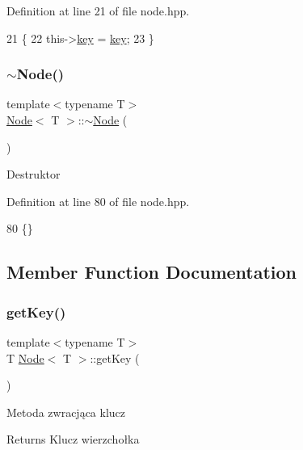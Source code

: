 Definition at line 21 of file node.\+hpp.


\begin{DoxyCode}
21                     \{
22             this->\hyperlink{classNode_a9d5e5c1914f5ed67389740354a607527}{key} = \hyperlink{classNode_a9d5e5c1914f5ed67389740354a607527}{key};
23         \}
\end{DoxyCode}
\mbox{\label{classNode_ae923d0417581dd19784d55b901f0f7f0}} 
\subsubsection{\texorpdfstring{$\sim$\+Node()}{~Node()}}
{\footnotesize\ttfamily template$<$typename T$>$ \\
\hyperlink{classNode}{Node}$<$ T $>$\+::$\sim$\hyperlink{classNode}{Node} (\begin{DoxyParamCaption}{ }\end{DoxyParamCaption})\hspace{0.3cm}{\ttfamily [inline]}}

Destruktor 

Definition at line 80 of file node.\+hpp.


\begin{DoxyCode}
80 \{\}
\end{DoxyCode}


\subsection{Member Function Documentation}
\mbox{\label{classNode_a3c04afa4e4c8e555cc87a22757ab5f6a}} 
\subsubsection{\texorpdfstring{get\+Key()}{getKey()}}
{\footnotesize\ttfamily template$<$typename T$>$ \\
T \hyperlink{classNode}{Node}$<$ T $>$\+::get\+Key (\begin{DoxyParamCaption}{ }\end{DoxyParamCaption})\hspace{0.3cm}{\ttfamily [inline]}}

Metoda zwracjąca klucz \begin{DoxyReturn}{Returns}
Klucz wierzchołka 
\end{DoxyReturn}


